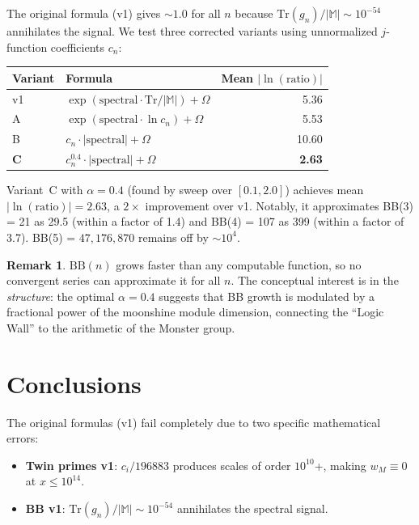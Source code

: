 \documentclass[11pt]{amsart}
\theoremstyle{definition}
\newtheorem{remark}[theorem]{Remark}
\begin{document}
The original formula (v1) gives $\sim 1.0$ for all $n$ because $\mathrm{Tr}(g_n)/|\mathbb{M}| \sim 10^{-54}$ annihilates the signal. We test three corrected variants using unnormalized $j$-function coefficients $c_n$:

\begin{center}
\begin{tabular}{l l r}
\toprule
Variant & Formula & Mean $|\ln(\text{ratio})|$ \\
\midrule
v1 & $\exp(\text{spectral} \cdot \mathrm{Tr}/|\mathbb{M}|) + \Omega$ & 5.36 \\
A & $\exp(\text{spectral} \cdot \ln c_n) + \Omega$ & 5.53 \\
B & $c_n \cdot |\text{spectral}| + \Omega$ & 10.60 \\
\textbf{C} & $c_n^{0.4} \cdot |\text{spectral}| + \Omega$ & \textbf{2.63} \\
\bottomrule
\end{tabular}
\end{center}

Variant~C with $\alpha = 0.4$ (found by sweep over $[0.1, 2.0]$) achieves mean $|\ln(\text{ratio})| = 2.63$, a $2\times$ improvement over v1. Notably, it approximates BB(3) = 21 as 29.5 (within a factor of 1.4) and BB(4) = 107 as 399 (within a factor of 3.7). BB(5) = $47{,}176{,}870$ remains off by $\sim 10^4$.

\begin{remark}
$\mathrm{BB}(n)$ grows faster than any computable function, so no convergent series can approximate it for all $n$. The conceptual interest is in the \emph{structure}: the optimal $\alpha = 0.4$ suggests that BB growth is modulated by a fractional power of the moonshine module dimension, connecting the ``Logic Wall'' to the arithmetic of the Monster group.
\end{remark}


\section{Conclusions}
\label{sec:conclusions}

The original formulas (v1) fail completely due to two specific mathematical errors:
\begin{itemize}
\item \textbf{Twin primes v1}: $c_i/196883$ produces scales of order $10^{10}$+, making $w_M \equiv 0$ at $x \leq 10^{14}$.
\item \textbf{BB v1}: $\mathrm{Tr}(g_n)/|\mathbb{M}| \sim 10^{-54}$ annihilates the spectral signal.
\end{itemize}
\end{document}
